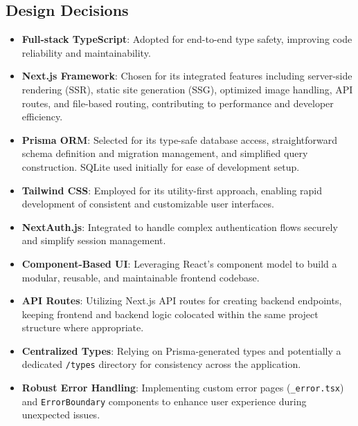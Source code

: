 \documentclass{article}
\begin{document}
\subsection{Design Decisions}
\begin{itemize}[label=\textbullet]
    \item \textbf{Full-stack TypeScript}: Adopted for end-to-end type safety, improving code reliability and maintainability.
    \item \textbf{Next.js Framework}: Chosen for its integrated features including server-side rendering (SSR), static site generation (SSG), optimized image handling, API routes, and file-based routing, contributing to performance and developer efficiency.
    \item \textbf{Prisma ORM}: Selected for its type-safe database access, straightforward schema definition and migration management, and simplified query construction. SQLite used initially for ease of development setup.
    \item \textbf{Tailwind CSS}: Employed for its utility-first approach, enabling rapid development of consistent and customizable user interfaces.
    \item \textbf{NextAuth.js}: Integrated to handle complex authentication flows securely and simplify session management.
    \item \textbf{Component-Based UI}: Leveraging React's component model to build a modular, reusable, and maintainable frontend codebase.
    \item \textbf{API Routes}: Utilizing Next.js API routes for creating backend endpoints, keeping frontend and backend logic colocated within the same project structure where appropriate.
    \item \textbf{Centralized Types}: Relying on Prisma-generated types and potentially a dedicated \texttt{/types} directory for consistency across the application.
    \item \textbf{Robust Error Handling}: Implementing custom error pages (\texttt{\_error.tsx}) and \texttt{ErrorBoundary} components to enhance user experience during unexpected issues.
\end{itemize}
\end{document}
